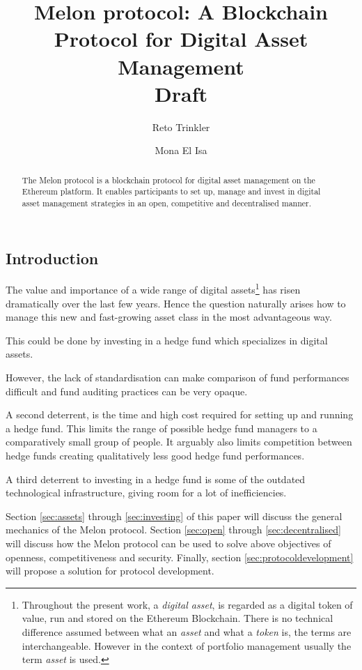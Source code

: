 \documentclass[9pt,oneside]{amsart}
\title{Melon protocol: A Blockchain Protocol for Digital Asset Management \\ {\smaller \textbf{Draft}}}
\author{Reto Trinkler}
\author{Mona El Isa}
\theoremstyle{plain}
\begin{document}
	
\begin{abstract}
	
The Melon protocol is a blockchain protocol for digital asset management on the Ethereum platform. It enables participants to set up, manage and invest in digital asset management strategies in an open, competitive and decentralised manner.

\end{abstract}

\maketitle

\setlength{\columnsep}{20pt}

\begin{multicols}{2}
	
\section{Introduction}\label{sec:introduction}

The value and importance of a wide range of digital assets\footnote{Throughout the present work, a \textit{digital asset}, is regarded as a digital token of value, run and stored on the Ethereum Blockchain. There is no technical difference assumed between what an \textit{asset} and what a \textit{token} is, the terms are interchangeable. However in the context of portfolio management usually the term \textit{asset} is used.} has risen dramatically over the last few years. Hence the question naturally arises how to manage this new and fast-growing asset class in the most advantageous way.

This could be done by investing in a hedge fund which specializes in digital assets. 

However, the lack of standardisation can make comparison of fund performances difficult and fund auditing practices can be very opaque.

A second deterrent, is the time and high cost required for setting up and running a hedge fund. This limits the range of possible hedge fund managers to a comparatively small group of people. It arguably also limits competition between hedge funds creating qualitatively less good hedge fund performances\cite{mitstudy}. 

A third deterrent to investing in a hedge fund is some of the outdated technological infrastructure, giving room for a lot of inefficiencies.

Section \ref{sec:assets} through \ref{sec:investing} of this paper will discuss the general mechanics of the Melon protocol.
Section \ref{sec:open} through \ref{sec:decentralised} will discuss how the Melon protocol can be used to solve above objectives of openness, competitiveness and security.
Finally, section \ref{sec:protocoldevelopment} will propose a solution for protocol development.


\end{multicols}
\end{document}
